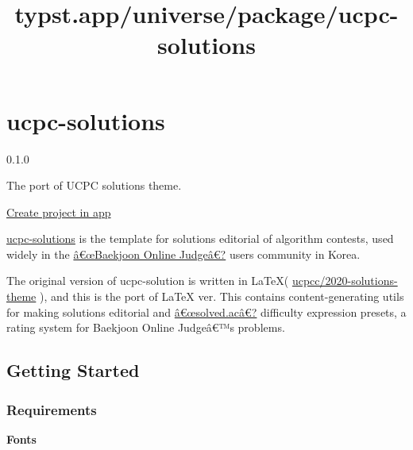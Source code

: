 \title{typst.app/universe/package/ucpc-solutions}

\label{banner}
\label{template-thumbnail}

\section{ucpc-solutions}\label{ucpc-solutions}

{ 0.1.0 }

The port of UCPC solutions theme.

\href{/app?template=ucpc-solutions&version=0.1.0}{Create project in app}

\label{readme}
\href{https://github.com/ShapeLayer/ucpc-solutions__typst}{ucpc-solutions}
is the template for solutions editorial of algorithm contests, used
widely in the \href{https://acmicpc.net/}{â€œBaekjoon Online Judgeâ€?}
users community in Korea.

The original version of ucpc-solution is written in LaTeX(
\href{https://github.com/ucpcc/2020-solutions-theme}{ucpcc/2020-solutions-theme}
), and this is the port of LaTeX ver. This contains content-generating
utils for making solutions editorial and
\href{https://solved.ac/}{â€œsolved.acâ€?} difficulty expression
presets, a rating system for Baekjoon Online Judgeâ€™s problems.

\subsection{Getting Started}\label{getting-started}

\begin{Shaded}
\begin{Highlighting}[]

\NormalTok{)}
\end{Highlighting}
\end{Shaded}

\subsubsection{Requirements}\label{requirements}

\textbf{Fonts}

